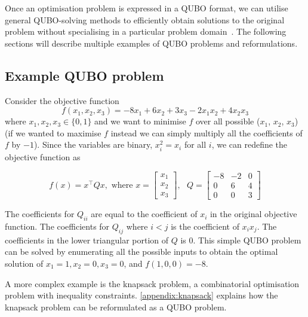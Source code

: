 Once an optimisation problem is expressed in a QUBO format, we can utilise general QUBO-solving methods to efficiently obtain solutions to the original problem without specialising in a particular problem domain~\cite{b1}. The following sections will describe multiple examples of QUBO problems and reformulations.

\subsection{Example QUBO problem}\label{subsection:example_qubo}
Consider the objective function \begin{equation}
f(x_1, x_2, x_3) = -8x_1 + 6x_2 + 3x_3 - 2 x_1 x_2 + 4 x_2 x_3
\end{equation} where $x_1, x_2, x_3 \in \{0, 1\}$ and we want to minimise $f$ over all possible ($x_1$, $x_2$, $x_3$) (if we wanted to maximise $f$ instead we can simply multiply all the coefficients of $f$ by $-1$). Since the variables are binary, $x_i^2 = x_i$ for all $i$, we can redefine the objective function as 

\begin{equation}
f(x) = x^\intercal Q x, \text{ where } x = \begin{bmatrix}
x_1 \\
x_2 \\
x_3 
\end{bmatrix}, \text{ }
Q = \begin{bmatrix}
-8 & -2 & 0\\
0 & 6 & 4\\
0 & 0 & 3
\end{bmatrix}
\end{equation}

The coefficients for $Q_{ii}$ are equal to the coefficient of $x_i$ in the original objective function. The coefficients for $Q_{ij}$ where $i < j$ is the coefficient of $x_{i}x_j$. The coefficients in the lower triangular portion of $Q$ is $0$. This simple QUBO problem can be solved by enumerating all the possible inputs to obtain the optimal solution of $x_1 = 1, x_2 = 0, x_3 = 0$, and $f(1,0,0) = -8$.

A more complex example is the knapsack problem, a combinatorial optimisation problem with inequality constraints. \autoref{appendix:knapsack} explains how the knapsack problem can be reformulated as a QUBO problem.

